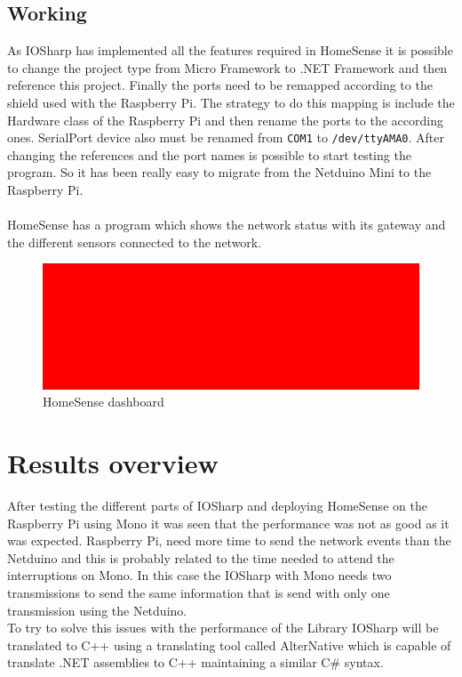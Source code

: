 \subsection{Working}\label{SS:IOEx-HomeSense-Working}
As IOSharp has implemented all the features required in HomeSense it is possible to change the project type from Micro Framework to .NET Framework and then reference this project. Finally the ports need to be remapped according to the shield used with the Raspberry Pi. The strategy to do this mapping is include the Hardware class of the Raspberry Pi and then rename the ports to the according ones. SerialPort device also must be renamed from \verb!COM1! to \verb!/dev/ttyAMA0!. After changing the references and the port names is possible to start testing the program. So it has been really easy to migrate from the Netduino Mini to the Raspberry Pi.
\\
\\
HomeSense has a program which shows the network status with its gateway and the different sensors connected to the network.
\begin{figure}[H]\begin{center}
 \centering
  \captionsetup{justification=centering}
  \includegraphics[width=1\textwidth]{pictures/sample/red}
  \caption{HomeSense dashboard\label{fig:IOEx-HS-Dash}}
\end{center}\end{figure}

\section{Results overview}\label{S:Results-overview}
After testing the different parts of IOSharp and deploying HomeSense on the Raspberry Pi using Mono it was seen that the performance was not as good as it was expected. Raspberry Pi, need more time to send the network events than the Netduino and this is probably related to the time needed to attend the interruptions on Mono. In this case the IOSharp with Mono needs two transmissions to send the same information that is send with only one transmission using the Netduino.
\\
To try to solve this issues with the performance of the Library IOSharp will be translated to C++ using a translating tool called AlterNative which is capable of translate .NET assemblies to C++ maintaining a similar C\# syntax.